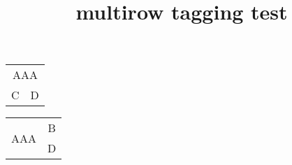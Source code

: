 \documentclass{article}
\title{multirow tagging test}
\begin{document}
\begin{tabular}{cc}
\multicolumn{2}{c}{AAA} \\
C & D
\end{tabular}

\begin{tabular}{cc}
\multirow{2}{*}{AAA} & B \\
& D
\end{tabular}
\end{document}

